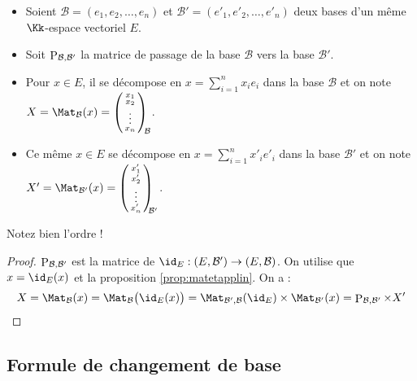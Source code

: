 \documentclass[class=report,crop=false]{standalone}
\begin{document}
\begin{itemize}
  \item Soient $\mathcal{B}=(e_1, e_2, \ldots ,e_n)$ et
$\mathcal{B}' = (e'_1, e'_2, \ldots ,e'_n)$ deux bases d'un même $\Kk$-espace vectoriel $E$.

  \item Soit $\mathop{\mathrm{P}}\nolimits_{\mathcal{B},\mathcal{B}'}$ la matrice de passage de
la base $\mathcal{B}$ vers la base $\mathcal{B}'$.

  \item Pour $x \in E$, il se décompose en $x=\sum_{i=1}^n x_ie_i$ dans la base $\mathcal{B}$
  et on note $X = \Mat_\mathcal{B} (x) =
\left(\begin{smallmatrix}x_1\cr x_2\cr \vdots \cr x_n
\end{smallmatrix}\right)_{\!\!\mathcal{B}}$.

  \item Ce même $x \in E$ se décompose en $x=\sum_{i=1}^n x'_ie'_i$ dans la base $\mathcal{B}'$
  et on note $X' = \Mat_{\mathcal{B}'} (x) =
\left(\begin{smallmatrix}x'_1\cr x'_2\cr \vdots \cr x'_n
\end{smallmatrix}\right)_{\!\!\!\mathcal{B}'}$.
\end{itemize}

\begin{proposition}
\sauteligne
{}
\end{proposition}
Notez bien l'ordre !

\begin{proof}
$\mathop{\mathrm{P}}\nolimits_{\mathcal{B},\mathcal{B}'}$ est la matrice de $\id_E : (E,\mathcal{B}')\to (E,\mathcal{B})$.
On utilise que $x = \id_E(x)$ et la proposition \ref{prop:matetapplin}.
On a :
$$X
= \Mat_\mathcal{B} (x)
= \Mat_{\mathcal{B}} \big( \id_E(x) \big)
= \Mat_{\mathcal{B}',\mathcal{B}} (\id_E) \times \Mat_{\mathcal{B}'} (x)
= \Pass_{\mathcal{B},\mathcal{B}'} \times X'$$
\end{proof}


\subsection{Formule de changement de base}
\end{document}
